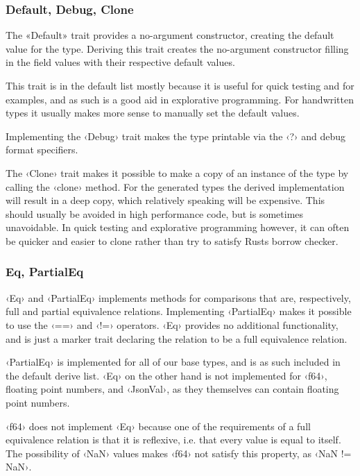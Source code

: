 
\subsubsection{Default, Debug, Clone}

The «Default» trait provides a no-argument constructor, creating the default value for the type. Deriving this trait creates the no-argument constructor filling in the field values with their respective default values.

This trait is in the default list mostly because it is useful for quick testing and for examples, and as such is a good aid in explorative programming. For handwritten types it usually makes more sense to manually set the default values.

Implementing the ‹Debug› trait makes the type printable via the ‹?› and  debug format specifiers.

The ‹Clone› trait makes it possible to make a copy of an instance of the type by calling the ‹clone› method. For the generated types the derived implementation will result in a deep copy, which relatively speaking will be expensive. This should usually be avoided in high performance code, but is sometimes unavoidable. In quick testing and explorative programming however, it can often be quicker and easier to clone rather than try to satisfy Rusts borrow checker.

\subsubsection{Eq, PartialEq}

‹Eq› and ‹PartialEq› implements methods for comparisons that are, respectively, full and partial equivalence relations. Implementing ‹PartialEq› makes it possible to use the ‹==› and ‹!=› operators. ‹Eq› provides no additional functionality, and is just a marker trait declaring the relation to be a full equivalence relation.

‹PartialEq› is implemented for all of our base types, and is as such included in the default derive list. ‹Eq› on the other hand is not implemented for ‹f64›, floating point numbers, and ‹JsonVal›, as they themselves can contain floating point numbers.

‹f64› does not implement ‹Eq› because one of the requirements of a full equivalence relation is that it is reflexive, i.e. that every value is equal to itself. The possibility of ‹NaN› values makes ‹f64› not satisfy this property, as ‹NaN != NaN›.

